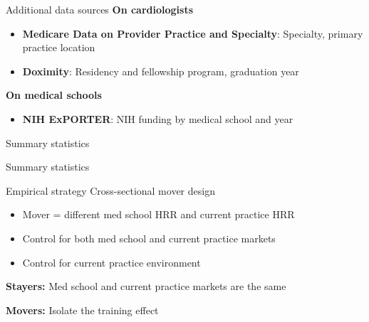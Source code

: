 \documentclass[10pt,aspectratio=169]{beamer}
\begin{document}
\begin{frame}{Additional data sources}
    \textbf{On cardiologists}
    \begin{itemize}
        \item \textbf{Medicare Data on Provider Practice and Specialty}: Specialty, primary practice location
        \item \textbf{Doximity}: Residency and fellowship program, graduation year
    \end{itemize}

    \vspace{5mm}
    \textbf{On medical schools}
    \begin{itemize}
        \item \textbf{NIH ExPORTER}: NIH funding by medical school and year
    \end{itemize}
\end{frame}



\begin{frame}{Summary statistics}
    \centering
    
\end{frame}

\begin{frame}{Summary statistics}
    \centering
    
\end{frame}

\begin{frame}{Empirical strategy}
    Cross-sectional mover design 
        \begin{itemize}
            \item Mover = different med school HRR and current practice HRR
            \item Control for both med school and current practice markets 
            \item Control for current practice environment
        \end{itemize}

    \vspace{10mm}
    \textbf{Stayers:} Med school and current practice markets are the same
    
    \textbf{Movers:} Isolate the training effect
\end{frame}
\end{document}
